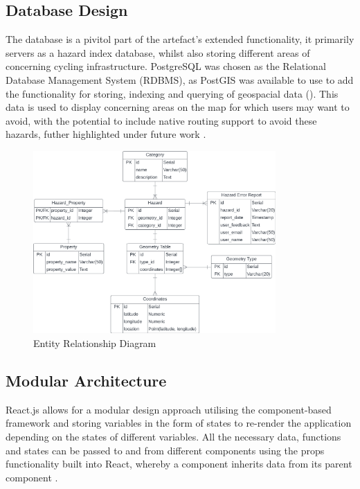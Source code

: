 \subsection{Database Design}
\label{system:database-design}

The database is a pivitol part of the artefact's extended functionality, it primarily servers as a hazard index database, whilst also storing different areas of concerning cycling infrastructure. PostgreSQL was chosen as the Relational Database Management System (RDBMS), as PostGIS was available to use to add the functionality for storing, indexing and querying of geospacial data (\cite{noauthor_postgis_nodate}). This data is used to display concerning areas on the map for which users may want to avoid, with the potential to include native routing support to avoid these hazards, futher highlighted under future work  . 

\begin{figure}[!ht]
  \centering
  \includegraphics[width=350px]{figures/erd.png}
  \caption{Entity Relationship Diagram}
  \label{fig:erd}
\end{figure}

\subsection{Modular Architecture}
\label{system:modular-architecture}
React.js allows for a modular design approach utilising the component-based framework and storing variables in the form of states to re-render the application depending on the states of different variables. All the necessary data, functions and states can be passed to and from different components using the props functionality built into React, whereby a component inherits data from its parent component .

